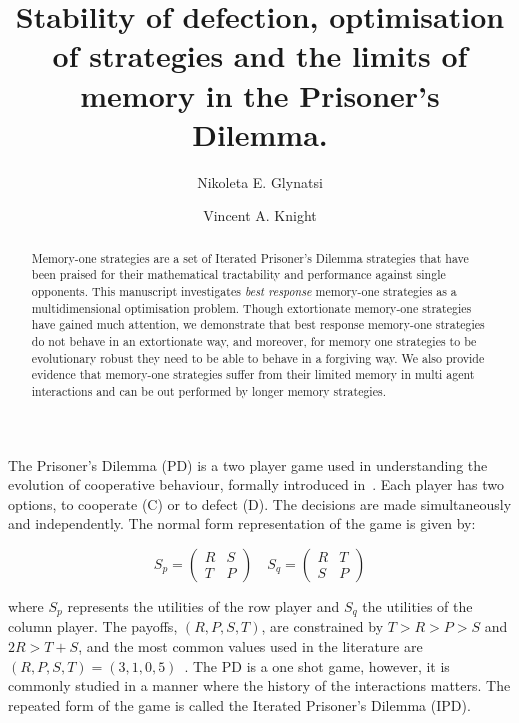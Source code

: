 \documentclass[10pt]{article}
\title{Stability of defection, optimisation of strategies and the limits of
       memory in the Prisoner's Dilemma.}
\author[1]{Nikoleta E. Glynatsi}
\author[1]{Vincent A. Knight}
\affil[1]{Cardiff University, School of Mathematics, Cardiff, United Kingdom}
\date{}
\begin{document}
\maketitle

\begin{abstract}
    Memory-one strategies are a set of Iterated Prisoner's Dilemma strategies
    that have been praised for their mathematical tractability and performance
    against single opponents. This manuscript investigates \textit{best
    response} memory-one strategies as a multidimensional
    optimisation problem. Though extortionate memory-one strategies have gained
    much attention, we demonstrate that best response memory-one strategies do not
    behave in an extortionate way, and moreover, for memory one strategies to be
    evolutionary robust they need to be able to behave in a forgiving way. We
    also provide evidence that memory-one strategies suffer from their limited
    memory in multi agent interactions and can be out performed by
    longer memory strategies.
\end{abstract}

The Prisoner's Dilemma (PD) is a two player game used in understanding the
evolution of cooperative behaviour, formally introduced in~\cite{Flood1958}.
Each player has two options, to cooperate (C) or to defect (D). The decisions
are made simultaneously and independently. The normal form representation of the
game is given by:

\begin{equation}\label{equ:pd_definition}
    S_p =
    \begin{pmatrix}
        R & S  \\
        T & P
    \end{pmatrix}
    \quad
    S_q =
    \begin{pmatrix}
        R & T  \\
        S & P
    \end{pmatrix}
\end{equation}

where \(S_p\) represents the utilities of the row player and \(S_q\) the
utilities of the column player. The payoffs, \((R, P, S, T)\), are constrained
by \(T > R > P > S\) and \(2R > T + S\), and the most common values used in the
literature are \((R, P, S, T) = (3, 1, 0, 5)\)~\cite{Axelrod1981}.
The PD is a one shot game, however, it is commonly studied in a manner where the
history of the interactions matters. The repeated form of the game is called the
Iterated Prisoner's Dilemma (IPD).
\end{document}
